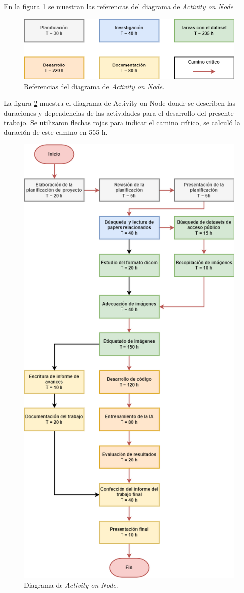 \documentclass[
11pt, %
]{charter}
\begin{document}
En la figura \ref{fig:AoNRef} se muestran las referencias del diagrama de \textit{Activity on Node}

\begin{figure}[htpb]
	\centering 
	\includegraphics[width=.7\textwidth]{./Figuras/AoNReferences.png}
	\caption{Referencias del diagrama de \textit{Activity on Node}.}
	\label{fig:AoNRef}
\end{figure}

La figura \ref{fig:AoN} muestra el diagrama de Activity on Node donde se describen las duraciones
y dependencias de las actividades para el desarrollo del presente trabajo. Se utilizaron flechas
rojas para indicar el camino crítico, se calculó la duración de este camino en 555 h.


\begin{figure}[htpb]
\centering 
\includegraphics[width=.7\textwidth]{./Figuras/ActivityonNode.png}
\caption{Diagrama de \textit{Activity on Node}.}
\label{fig:AoN}
\end{figure}
\end{document}
